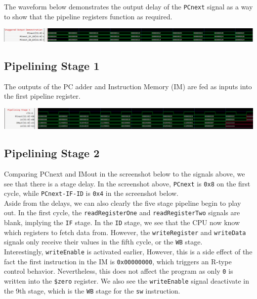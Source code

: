 \documentclass[twocolumn]{article}
\newcommand{\cc}[1]{\texttt{#1}}
\begin{document}
The waveform below demonstrates the output delay of the \cc{PCnext} signal as a way to show that the pipeline registers function as required. 

\begingroup
    \centering
    \medskip
    \includegraphics[width=\columnwidth]{Lab-Tex/Lab6-images/o1.png}
    \medskip
\endgroup



\subsection{Pipelining Stage 1}

The outputs of the PC adder and Instruction Memory (IM) are fed as inputs into the first pipeline register.

\begingroup
    \centering
    \medskip
    \includegraphics[width=\columnwidth]{Lab-Tex/Lab6-images/p2.png}
    \medskip
\endgroup

\subsection{Pipelining Stage 2}

Comparing PCnext and IMout in the screenshot below to the signals above, we see that there is a stage delay. In the screenshot above, \cc{PCnext} is \cc{0x8} on the first cycle, while \cc{PCnext-IF-ID} is \cc{0x4} in the screenshot below.\\

Aside from the delays, we can also clearly the five stage pipeline begin to play out. In the first cycle, the \cc{readRegisterOne} and \cc{readRegisterTwo} signals are blank, implying the \cc{IF} stage. In the \cc{ID} stage, we see that the CPU now know which registers to fetch data from. However, the \cc{writeRegister} and \cc{writeData} signals only receive their values in the fifth cycle, or the \cc{WB} stage. \\

Interestingly, \cc{writeEnable} is activated earlier, However, this is a side effect of the fact the first instruction in the IM is \cc{0x00000000}, which triggers an R-type control behavior. Nevertheless, this does not affect the program as only \cc{0} is written into the \cc{\$zero} register. We also see the \cc{writeEnable} signal deactivate in the 9th stage, which is the \cc{WB} stage for the \cc{sw} instruction. \\
\end{document}

